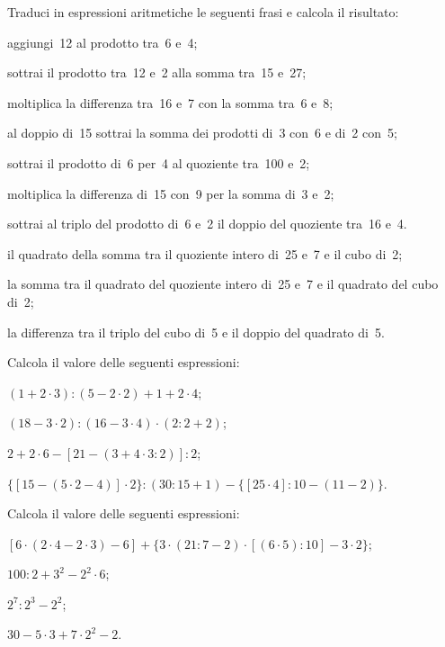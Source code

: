 \begin{esercizio}[\Ast]
Traduci in espressioni aritmetiche le seguenti frasi e calcola il risultato:
 \begin{enumeratea}
 \item aggiungi~12 al prodotto tra~6 e~4;
 \item sottrai il prodotto tra~12 e~2 alla somma tra~15 e~27;
 \item moltiplica la differenza tra~16 e~7 con la somma tra~6 e~8;
 \item al doppio di~15 sottrai la somma dei prodotti di~3 con~6 e di~2 con~5;
 \item sottrai il prodotto di~6 per~4 al quoziente tra~100 e~2;
 \item moltiplica la differenza di~15 con~9 per la somma di~3 e~2;
 \item sottrai al triplo del prodotto di~6 e~2 il doppio del quoziente tra~16 e~4.
 \item il quadrato della somma tra il quoziente intero di~25 e~7 e il cubo di~2;
 \item la somma tra il quadrato del quoziente intero di~25 e~7 e il quadrato del cubo di~2;
 \item la differenza tra il triplo del cubo di~5 e il doppio del quadrato di~5.
 \end{enumeratea}
\end{esercizio}

\begin{esercizio}[\Ast]
 Calcola il valore delle seguenti espressioni:
 \begin{enumeratea}
 \item $(1+2\cdot3):(5-2\cdot2)+1+2\cdot4$;
 \item $ (18-3\cdot2):(16-3\cdot4)\cdot(2:2+2)$;
 \item $2+2\cdot6-[21-(3+4\cdot 3:2)]:2$;
 \item $\lbrace[15-(5\cdot2-4)]\cdot2\rbrace:(30:15+1)-\lbrace[25\cdot4]:10-(11-2)\rbrace$.
 \end{enumeratea}
\end{esercizio}
\pagebreak
\begin{esercizio}[\Ast]
 Calcola il valore delle seguenti espressioni:
 \begin{enumeratea}
 \item $[6\cdot(2\cdot4-2\cdot3)-6]+\lbrace3\cdot(21:7-2)\cdot[(6\cdot5):10]-3\cdot2\rbrace$;
 \item $100:2+3^2-2^2\cdot6$;
 \item $2^7:2^3-2^2$;
 \item $30-5\cdot3+7\cdot2^2-2$.
 \end{enumeratea}
\end{esercizio}

